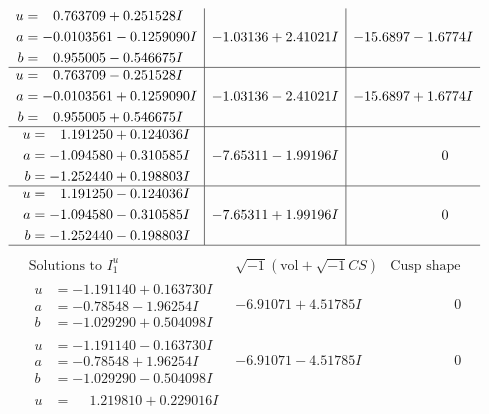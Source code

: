 \documentclass[1p]{elsarticle_modified}
\theoremstyle{definition}
\newcommand{\I}{\sqrt{-1}}
\begin{document}
$$\begin{array}{c|c|c}
\begin{aligned}
u &= \phantom{-}0.763709 + 0.251528 I \\
a &= -0.0103561 - 0.1259090 I \\
b &= \phantom{-}0.955005 - 0.546675 I\end{aligned}
 & -1.03136 + 2.41021 I & -15.6897 - 1.6774 I \\ \hline\begin{aligned}
u &= \phantom{-}0.763709 - 0.251528 I \\
a &= -0.0103561 + 0.1259090 I \\
b &= \phantom{-}0.955005 + 0.546675 I\end{aligned}
 & -1.03136 - 2.41021 I & -15.6897 + 1.6774 I \\ \hline\begin{aligned}
u &= \phantom{-}1.191250 + 0.124036 I \\
a &= -1.094580 + 0.310585 I \\
b &= -1.252440 + 0.198803 I\end{aligned}
 & -7.65311 - 1.99196 I & \phantom{-0.000000 } 0 \\ \hline\begin{aligned}
u &= \phantom{-}1.191250 - 0.124036 I \\
a &= -1.094580 - 0.310585 I \\
b &= -1.252440 - 0.198803 I\end{aligned}
 & -7.65311 + 1.99196 I & \phantom{-0.000000 } 0\\
 \hline 
 \end{array}$$\newpage$$\begin{array}{c|c|c}  
\text{Solutions to }I^u_{1}& \I (\text{vol} + \sqrt{-1}CS) & \text{Cusp shape}\\
 \hline 
\begin{aligned}
u &= -1.191140 + 0.163730 I \\
a &= -0.78548 - 1.96254 I \\
b &= -1.029290 + 0.504098 I\end{aligned}
 & -6.91071 + 4.51785 I & \phantom{-0.000000 } 0 \\ \hline\begin{aligned}
u &= -1.191140 - 0.163730 I \\
a &= -0.78548 + 1.96254 I \\
b &= -1.029290 - 0.504098 I\end{aligned}
 & -6.91071 - 4.51785 I & \phantom{-0.000000 } 0 \\ \hline\begin{aligned}
u &= \phantom{-}1.219810 + 0.229016 I \\

\end{aligned}
\end{array}$$
\end{document}
